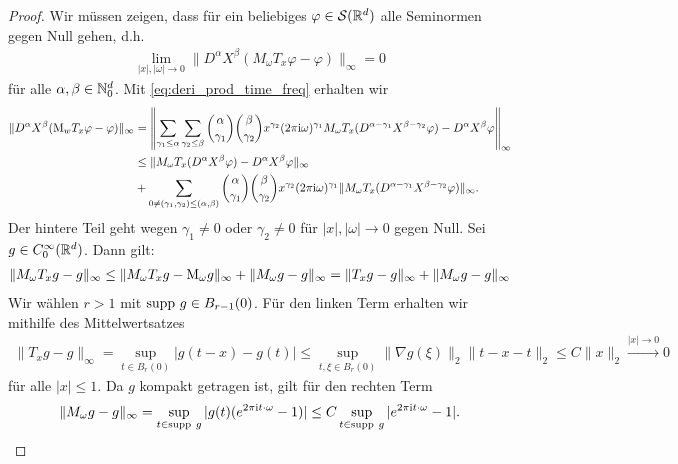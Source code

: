 \begin{proof}
	Wir müssen zeigen, dass für ein beliebiges $ \varphi \in \mathcal{S}(\mathbb{R}^d) $ alle Seminormen gegen Null gehen, d.h.
	\begin{align}\label{eq:strong_contiunity_to_show}
	\lim \limits_{|x|,|\omega| \to 0}
	\| D^\alpha X^\beta (M_\omega T_x \varphi - \varphi) \|_\infty = 0
	\end{align}
	für alle $ \alpha, \beta \in \mathbb{N}_0^d $. Mit \eqref{eq:deri_prod_time_freq} erhalten wir 
	\begin{align*}
	\| D^\alpha X^\beta (\mathrm{M}_w T_x \varphi - \varphi) \|_\infty
	&=
	\left\|
	\sum \limits_{\gamma_1 \leq \alpha}
	\sum \limits_{\gamma_2 \leq \beta}
	\binom{\alpha}{\gamma_1}
	\binom{\beta}{\gamma_2}
	x^{\gamma_2}
	(2 \pi \textrm{i} \omega)^{\gamma_1}
	M_\omega T_x(D^{\alpha- \gamma_1} X^{\beta-\gamma_2} \varphi)
	-D^\alpha X^\beta \varphi
	\right\|_\infty\\
	&\leq
	\| M_\omega T_x (D^\alpha X^\beta \varphi) - D^\alpha X^\beta \varphi \|_\infty\\
	&+
	\sum \limits_{0 \neq (\gamma_1,\gamma_2 ) \leq (\alpha,\beta)}
	\binom{\alpha}{\gamma_1}
	\binom{\beta}{\gamma_2}
	x^{\gamma_2}
	(2 \pi \textrm{i} \omega)^{\gamma_1}
	\|M_\omega T_x(D^{\alpha- \gamma_1} X^{\beta-\gamma_2} \varphi) \|_\infty.
	\end{align*}
	Der hintere Teil geht wegen $ \gamma_1 \neq 0 $ oder $ \gamma_2 \neq 0 $ für $ |x|, |\omega| \to 0 $  gegen Null. 
	Sei $ g \in C^\infty_0(\mathbb{R}^d) $. Dann gilt:
	\begin{align*}
	\| M_\omega T_x g - g \|_\infty
	\leq
	\| M_\omega T_x g - \mathrm{M}_\omega g\|_\infty
	+
	\| M_\omega g - g \|_\infty 
	=
	\|T_x g - g \|_\infty + \| M_\omega g - g\|_\infty
	\end{align*}
	Wir wählen $ r > 1  $ mit $ \mathrm{supp} \ g \in B_{r-1}(0) $. 
	Für den linken Term erhalten wir mithilfe des Mittelwertsatzes
	\begin{align*}
	\|T_x g - g \|_\infty
	= 
	\sup \limits_{t \in B_r(0)} 
	| g(t -x ) - g(t) |
	\leq 
	\sup \limits_{t , \xi  \in B_r(0)} 
	\| \nabla g(\xi) \|_2 \| t -x  -t \|_2
	\leq
	C \| x \|_2 \overset{|x| \to 0}{\to} 0
	\end{align*}
	für alle $ |x| \leq 1 $. Da $ g  $ kompakt getragen ist, gilt für den rechten Term 
	\begin{align*}
	\| M_\omega g - g \|_\infty
	=
	\sup \limits_{t \in \mathrm{supp} \ g}
	| g(t) (e^{2\pi \textrm{i} t \cdot \omega} - 1) |
	\leq 
	C \sup \limits_{t \in \mathrm{supp} \ g} | e^{2 \pi \textrm{i} t \cdot \omega} - 1 |.
	\end{align*}

\end{proof}

